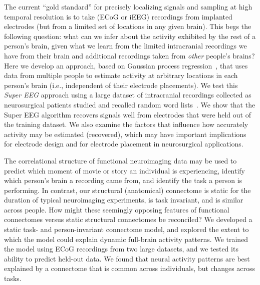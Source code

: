 The current ``gold standard'' for precisely localizing signals and
sampling at high temporal resolution is to take (ECoG or iEEG)
recordings from implanted electrodes (but from a limited set of
locations in any given brain).  This begs the following question: what
can we infer about the activity exhibited by the rest of a person's
brain, given what we learn from the limited intracranial recordings we
have from their brain and additional recordings taken from
\textit{other} people's brains?  Here we develop an approach, based on
Gaussian process regression~\cite{Rasm06}, that uses data from
multiple people to estimate activity at arbitrary
locations in each person's brain (i.e., independent of their electrode
placements).  We test this \textit{Super EEG} approach using a large
dataset of intracranial recordings collected as neurosurgical patients
studied and recalled random word lists~\cite{SedeEtal03, SedeEtal07a,
  SedeEtal07b, MannEtal11, MannEtal12}.  We show that the Super EEG
algorithm recovers signals well from electrodes that were held out of
the training dataset.  We also examine the factors that influence how
accurately activity may be estimated (recovered), which may have important
implications for electrode design and for electrode placement in
neurosurgical applications.




  The correlational structure of functional neuroimaging data may be
  used to predict which moment of movie or story an individual is
  experiencing, identify which person's brain a recording came from,
  and identify the task a person is performing.  In contrast, our
  structural (anatomical) connectome is static for the duration of
  typical neuroimaging experiments, is task invariant, and is similar
  across people.  How might these seemingly opposing features of
  functional connectomes versus static structural connectomes be
  reconciled?  We developed a static task- and person-invariant
  connectome model, and explored the extent to which the model could
  explain dynamic full-brain activity patterns.  We trained the model
  using ECoG recordings from two large datasets, and we tested its
  ability to predict held-out data.  We found that neural activity
  patterns are best explained by a connectome that is common across
  individuals, but changes across tasks.




